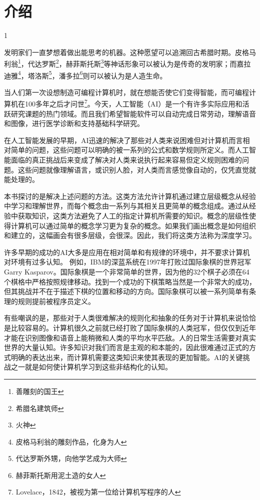 
\chapter{介绍}{1}


        发明家们一直梦想着做出能思考的机器。这种愿望可以追溯回古希腊时期。皮格马利翁\footnote{善雕刻的国王}，代达罗斯\footnote{希腊名建筑师}，赫菲斯托斯\footnote{火神}等神话形象可以被认为是传奇的发明家；而嘉拉迪雅\footnote{皮格马利翁的雕刻作品，化身为人}，塔洛斯\footnote{代达罗斯外甥，向他学艺成为大师}，潘多拉\footnote{赫菲斯托斯用泥土造的女人}则可以被认为是人造生命。


当人们第一次设想制造可编程计算机时，就在想能否使它们变得智能，而可编程计算机在100多年之后才问世\footnote{Lovelace，1842，被视为第一位给计算机写程序的人}。今天，人工智能（AI）是一个有许多实际应用和活跃研究课题的热门领域。而且我们希望智能软件可以自动完成日常劳动，理解语音和图像，进行医学诊断和支持基础科学研究。


在人工智能发展的早期，AI迅速的解决了那些对人类来说困难但对计算机而言相对简单的问题，这些问题可以明确的被一系列的公式和数学规则所定义。而人工智能面临的真正挑战后来变成了解决对人类来说执行起来容易但定义规则困难的问题。这些问题就像理解语言，或识别人脸，对人类而言感觉像自动的，仅凭直觉就能处理的。

本书探讨的是解决上述问题的方法。这类方法允许计算机通过建立层级概念从经验中学习和理解世界，而每个概念由一系列与其相关且更简单的概念组成。通过从经验中获取知识，这类方法避免了人工的指定计算机所需要的知识。概念的层级性使得计算机可以通过简单的概念学习更为复杂的概念。如果我们画出概念是如何组织和建立的，这幅画会有很多层级，会很深。因此，我们将这类方法称为深度学习。


许多早期的成功的AI大多是应用在相对简单和有规律的环境中，并不要求计算机对环境有过多认知。 例如，IBM的深蓝系统在1997年打败过国际象棋的世界冠军Garry Kasparov。国际象棋是一个非常简单的世界，因为他的32个棋子必须在64个棋格中严格按照规律移动。找到一个成功的下棋策略当然是一个非常大的成功，但其挑战并不在于描述下棋的位置和移动的方向。国际象棋可以被一系列简单有条理的规则提前被程序员定义。


有些嘲讽的是，那些对于人类很难解决的规则化和抽象的任务对于计算机来说恰恰是比较容易的。计算机很久之前就已经打败了国际象棋的人类冠军，但仅仅到近年才能在识别图像和语音上能稍微和人类的平均水平匹敌。人的日常生活需要对真实世界的大量认知。许多知识对我们而言是主观的和本能的，因此很难通过正式的方式明确的表达出来，而计算机需要这类知识来使其表现的更加智能。AI的关键挑战之一就是如何使计算机学习到这些非结构化的认知。

